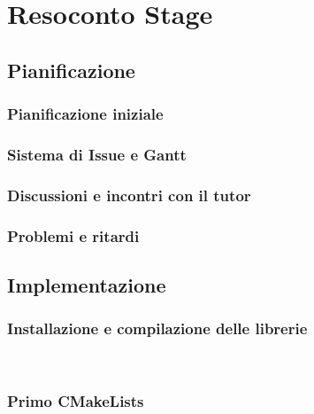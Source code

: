 
\chapter{Resoconto Stage}
\label{cap:resoconto-stage}

\section{Pianificazione}
\subsection{Pianificazione iniziale}

\subsection{Sistema di Issue e Gantt}

\subsection{Discussioni e incontri con il tutor}

\subsection{Problemi e ritardi}

\section{Implementazione}
\subsection{Installazione e compilazione delle librerie}
\\

\subsection{Primo CMakeLists}
\\

